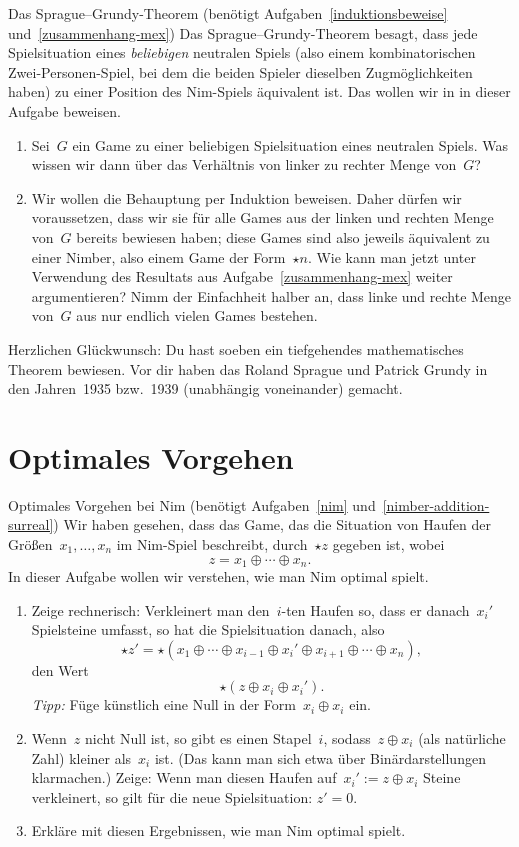 \documentclass{zirkelblatt}
\newcommand{\head}[1]{\section*{\rmfamily #1}}%
\begin{document}
\begin{aufgabe}{Das Sprague--Grundy-Theorem
(benötigt Aufgaben~\ref{induktionsbeweise} und~\ref{zusammenhang-mex})}
\label{sprague-grundy}
Das Sprague--Grundy-Theorem besagt, dass jede Spielsituation eines
\emph{beliebigen} neutralen Spiels (also einem
kombinatorischen Zwei-Personen-Spiel, bei dem die beiden Spieler dieselben
Zugmöglichkeiten haben) zu einer Position des Nim-Spiels äquivalent ist. Das
wollen wir in in dieser Aufgabe beweisen.
\begin{enumerate}
\item Sei~$G$ ein Game zu einer beliebigen Spielsituation eines neutralen
Spiels. Was wissen wir dann über das Verhältnis von linker zu rechter Menge
von~$G$?
\item Wir wollen die Behauptung per Induktion beweisen. Daher dürfen wir
voraussetzen, dass wir sie für alle Games aus der linken und rechten Menge
von~$G$ bereits bewiesen haben; diese Games sind also jeweils äquivalent zu
einer Nimber, also einem Game der Form~$\star n$. Wie kann man jetzt unter
Verwendung des Resultats aus Aufgabe~\ref{zusammenhang-mex} weiter argumentieren?
Nimm der Einfachheit halber an, dass linke und rechte Menge von~$G$ aus nur
endlich vielen Games bestehen.
\end{enumerate}
Herzlichen Glückwunsch: Du hast soeben ein tiefgehendes mathematisches
Theorem bewiesen. Vor dir haben das Roland Sprague und Patrick Grundy in den
Jahren~1935 bzw.~1939 (unabhängig voneinander) gemacht.
\end{aufgabe}


\head{Optimales Vorgehen}

\begin{aufgabe}{Optimales Vorgehen bei Nim
(benötigt Aufgaben~\ref{nim} und~\ref{nimber-addition-surreal})}
\label{nim-optimal}
Wir haben gesehen, dass das Game, das die Situation von Haufen der
Größen~$x_1,\ldots,x_n$ im Nim-Spiel beschreibt, durch~$\star z$ gegeben ist,
wobei
\[ z = x_1 \oplus \cdots \oplus x_n. \]
In dieser Aufgabe wollen wir verstehen, wie man Nim optimal
spielt.
\begin{enumerate}
\item Zeige rechnerisch: Verkleinert man den~$i$-ten Haufen so, dass er
danach~$x_i'$ Spielsteine umfasst, so hat die Spielsituation danach, also
\[ \star z' = \star(x_1 \oplus \cdots \oplus x_{i-1} \oplus x_i' \oplus x_{i+1} \oplus
\cdots \oplus x_n), \]
den Wert
\[ \star(z \oplus x_i \oplus x_i'). \]
\emph{Tipp:} Füge künstlich eine Null in der Form~$x_i \oplus x_i$ ein.
\item Wenn~$z$ nicht Null ist, so gibt es einen Stapel~$i$, sodass~$z \oplus
x_i$ (als natürliche Zahl) kleiner als~$x_i$ ist. (Das kann man sich etwa über
Binärdarstellungen klarmachen.) Zeige: Wenn man diesen Haufen auf~$x_i' :=
z \oplus x_i$ Steine verkleinert, so gilt für die neue Spielsituation: $z' =
0$.
\item Erkläre mit diesen Ergebnissen, wie man Nim optimal spielt.
\end{enumerate}
\end{aufgabe}
\end{document}
